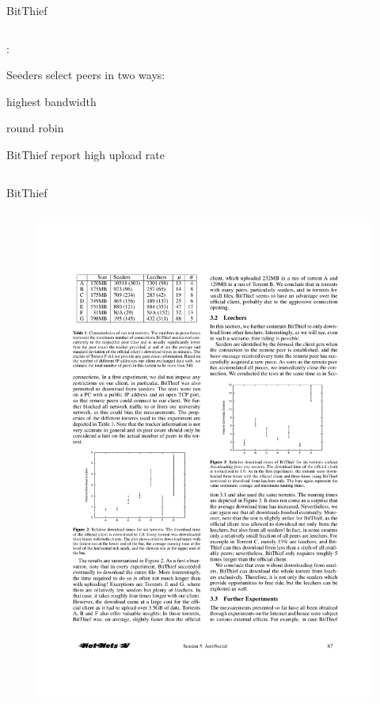 \begin{frame}{BitThief}
\begin{columns}
\begin{column}{0.56\textwidth}
:
\BI
\item Seeders select peers in two ways:
	\BI
	\item highest bandwidth
	\item round robin
	\EI
\item BitThief report high upload rate
\EI

\end{column}
\end{columns}

\end{frame}

\begin{frame}{BitThief}

\begin{columns}
\begin{column}{0.40\textwidth}
\begin{figure}
	\includegraphics[width=\textwidth]{bitthief2}

\end{figure}
\end{column}
\end{columns}
\end{frame}
